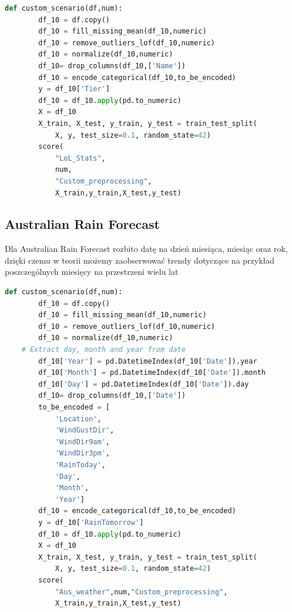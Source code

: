 \documentclass{book}
\begin{document}
\begin{lstlisting}[language=Python, caption={Indywidualny 
    scenariusz dla zestawu danych LoL Stats}, captionpos=b]
    def custom_scenario(df,num):
        df_10 = df.copy()
        df_10 = fill_missing_mean(df_10,numeric)
        df_10 = remove_outliers_lof(df_10,numeric)
        df_10 = normalize(df_10,numeric)
        df_10= drop_columns(df_10,['Name'])
        df_10 = encode_categorical(df_10,to_be_encoded)
        y = df_10['Tier']
        df_10 = df_10.apply(pd.to_numeric)
        X = df_10
        X_train, X_test, y_train, y_test = train_test_split(
            X, y, test_size=0.1, random_state=42)
        score(
            "LoL_Stats",
            num,
            "Custom_preprocessing",
            X_train,y_train,X_test,y_test)
\end{lstlisting}

\subsection{Australian Rain Forecast}
Dla Australian Rain Forecast rozbito datę na dzień miesiąca, 
miesiąc oraz rok, dzięki czemu w teorii możemy zaobserwować 
trendy dotyczące na przykład poszczególnych miesięcy na przestrzeni 
wielu lat

\begin{lstlisting}[language=Python, caption={Indywidualny 
    scenariusz dla zestawu danych Aus Weather}, captionpos=b]
    def custom_scenario(df,num):
        df_10 = df.copy()
        df_10 = fill_missing_mean(df_10,numeric)
        df_10 = remove_outliers_lof(df_10,numeric)
        df_10 = normalize(df_10,numeric)
    # Extract day, month and year from date
        df_10['Year'] = pd.DatetimeIndex(df_10['Date']).year
        df_10['Month'] = pd.DatetimeIndex(df_10['Date']).month
        df_10['Day'] = pd.DatetimeIndex(df_10['Date']).day
        df_10= drop_columns(df_10,['Date'])
        to_be_encoded = [
            'Location',
            'WindGustDir',
            'WindDir9am',
            'WindDir3pm',
            'RainToday',
            'Day',
            'Month',
            'Year']
        df_10 = encode_categorical(df_10,to_be_encoded)
        y = df_10['RainTomorrow']
        df_10 = df_10.apply(pd.to_numeric)
        X = df_10
        X_train, X_test, y_train, y_test = train_test_split(
            X, y, test_size=0.1, random_state=42)
        score(
            "Aus_weather",num,"Custom_preprocessing",
            X_train,y_train,X_test,y_test)
\end{lstlisting}
\end{document}
